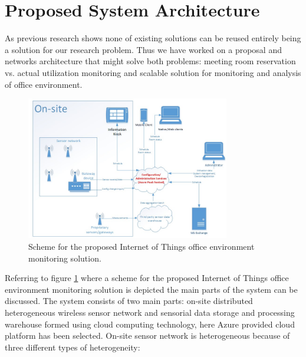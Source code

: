 \documentclass[journal]{IEEEtran}
\begin{document}
\section{Proposed System Architecture}
As previous research shows none of existing solutions can be reused entirely being a solution for our research problem. Thus we have worked on a proposal and networks architecture that might solve both problems: meeting room reservation vs. actual utilization monitoring and scalable solution for monitoring and analysis of office environment. 
\begin{figure}[!t]
\centering
\includegraphics[width=3.5in]{IoT_Scheme}
\caption{Scheme for the proposed Internet of Things office environment monitoring solution.}
\label{IoT_Scheme}
\end{figure}
Referring to figure \ref{IoT_Scheme} where a scheme for the proposed Internet of Things office environment monitoring solution is depicted the main parts of the system can be discussed. The system consists of two main parts: on-site distributed heterogeneous wireless sensor network and sensorial data storage and processing warehouse formed using cloud computing technology, here Azure provided cloud platform has been selected. 
On-site sensor network is heterogeneous because of three different types of heterogeneity:
\end{document}
